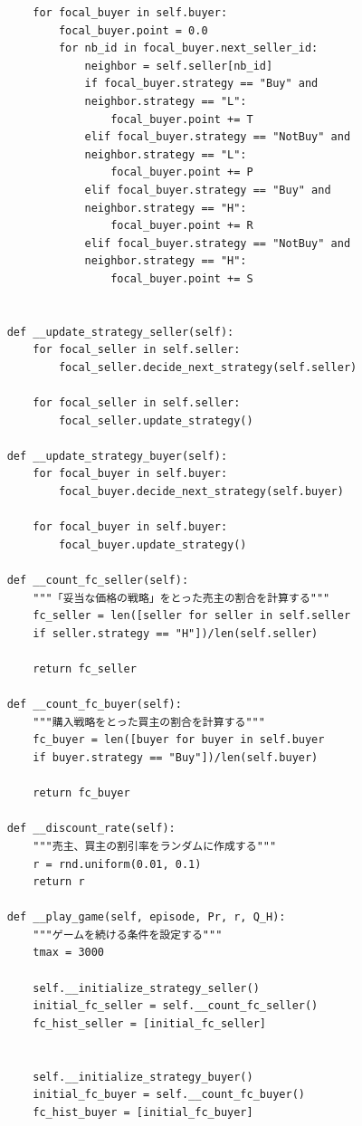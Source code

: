 \documentclass[a4paper,fontsize=11pt,report,notitlepage,line_length=38zw,number_of_lines=40,dvipdfmx]{jlreq}
\begin{document}
\begin{lstlisting}
        for focal_buyer in self.buyer:
            focal_buyer.point = 0.0
            for nb_id in focal_buyer.next_seller_id:
                neighbor = self.seller[nb_id]
                if focal_buyer.strategy == "Buy" and 
                neighbor.strategy == "L":    
                    focal_buyer.point += T
                elif focal_buyer.strategy == "NotBuy" and 
                neighbor.strategy == "L":   
                    focal_buyer.point += P
                elif focal_buyer.strategy == "Buy" and 
                neighbor.strategy == "H":   
                    focal_buyer.point += R
                elif focal_buyer.strategy == "NotBuy" and 
                neighbor.strategy == "H":  
                    focal_buyer.point += S


    def __update_strategy_seller(self):
        for focal_seller in self.seller:
            focal_seller.decide_next_strategy(self.seller)
        
        for focal_seller in self.seller:
            focal_seller.update_strategy()

    def __update_strategy_buyer(self):
        for focal_buyer in self.buyer:
            focal_buyer.decide_next_strategy(self.buyer)
        
        for focal_buyer in self.buyer:
            focal_buyer.update_strategy()

    def __count_fc_seller(self):
        """「妥当な価格の戦略」をとった売主の割合を計算する"""        
        fc_seller = len([seller for seller in self.seller 
        if seller.strategy == "H"])/len(self.seller)
    
        return fc_seller

    def __count_fc_buyer(self):
        """購入戦略をとった買主の割合を計算する"""        
        fc_buyer = len([buyer for buyer in self.buyer 
        if buyer.strategy == "Buy"])/len(self.buyer)
    
        return fc_buyer

    def __discount_rate(self):
        """売主、買主の割引率をランダムに作成する"""
        r = rnd.uniform(0.01, 0.1)
        return r

    def __play_game(self, episode, Pr, r, Q_H):
        """ゲームを続ける条件を設定する"""
        tmax = 3000

        self.__initialize_strategy_seller()
        initial_fc_seller = self.__count_fc_seller()
        fc_hist_seller = [initial_fc_seller]
        

        self.__initialize_strategy_buyer()
        initial_fc_buyer = self.__count_fc_buyer()
        fc_hist_buyer = [initial_fc_buyer]



\end{lstlisting}
\end{document}
